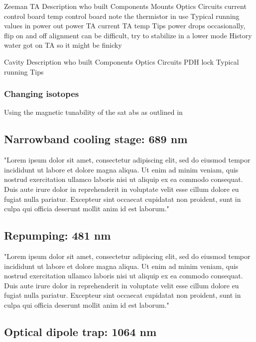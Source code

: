 	Zeeman TA
		Description
			who built
		Components
			Mounts
			Optics
			Circuits
				current control board
				temp control board
					note the thermistor in use
		Typical running values
			in power
			out power
			TA current
			TA temp
		Tips
			power drops occasionally, flip on and off
			alignment can be difficult, try to stabilize in a lower mode
		History
			water got on TA so it might be finicky
		
	Cavity
		Description
			who built
		Components
			Optics
			Circuits
				PDH lock
		Typical running
		Tips
	
		
	

\subsubsection{Changing isotopes} \label{sssec:change_iso}

Using the magnetic tunability of the sat abs as outlined in 


\subsection{Narrowband cooling stage: 689 nm}
\label{ssec:689sys}

"Lorem ipsum dolor sit amet, consectetur adipiscing elit, sed do eiusmod tempor incididunt ut labore et dolore magna aliqua. Ut enim ad minim veniam, quis nostrud exercitation ullamco laboris nisi ut aliquip ex ea commodo consequat. Duis aute irure dolor in reprehenderit in voluptate velit esse cillum dolore eu fugiat nulla pariatur. Excepteur sint occaecat cupidatat non proident, sunt in culpa qui officia deserunt mollit anim id est laborum."

\subsection{Repumping: 481 nm}
\label{ssec:481sys}

"Lorem ipsum dolor sit amet, consectetur adipiscing elit, sed do eiusmod tempor incididunt ut labore et dolore magna aliqua. Ut enim ad minim veniam, quis nostrud exercitation ullamco laboris nisi ut aliquip ex ea commodo consequat. Duis aute irure dolor in reprehenderit in voluptate velit esse cillum dolore eu fugiat nulla pariatur. Excepteur sint occaecat cupidatat non proident, sunt in culpa qui officia deserunt mollit anim id est laborum."

\subsection{Optical dipole trap: 1064 nm}
\label{ssec:1064sys}

